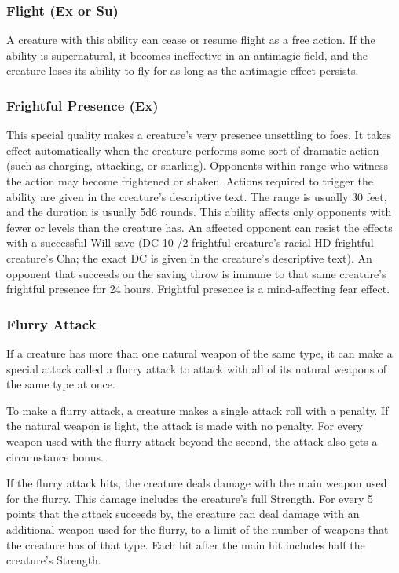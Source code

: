 \subsubsection{Flight (Ex or Su)} A creature with this ability can cease or resume flight as a free action. If the ability is supernatural, it becomes ineffective in an antimagic field, and the creature loses its ability to fly for as long as the antimagic effect persists.

\subsubsection{Frightful Presence (Ex)} This special quality makes a creature's very presence unsettling to foes. It takes effect automatically when the creature performs some sort of dramatic action (such as charging, attacking, or snarling). Opponents within range who witness the action may become frightened or shaken. Actions required to trigger the ability are given in the creature's descriptive text. The range is usually 30 feet, and the duration is usually 5d6 rounds. This ability affects only opponents with fewer  or levels than the creature has. An affected opponent can resist the effects with a successful Will save (DC 10 /2 frightful creature's racial HD \add frightful creature's Cha; the exact DC is given in the creature's descriptive text). An opponent that succeeds on the saving throw is immune to that same creature's frightful presence for 24 hours. Frightful presence is a mind-affecting fear effect. 


\subsubsection{Flurry Attack} If a creature has more than one natural weapon of the same type, it can make a special attack called a flurry attack to attack with all of its natural weapons of the same type at once.

To make a flurry attack, a creature makes a single attack roll with a  penalty. If the natural weapon is light, the attack is made with no penalty. For every weapon used with the flurry attack beyond the second, the attack also gets a  circumstance bonus.

If the flurry attack hits, the creature deals damage with the main weapon used for the flurry. This damage includes the creature's full Strength. For every 5 points that the attack succeeds by, the creature can deal damage with an additional weapon used for the flurry, to a limit of the number of weapons that the creature has of that type. Each hit after the main hit includes half the creature's Strength.

